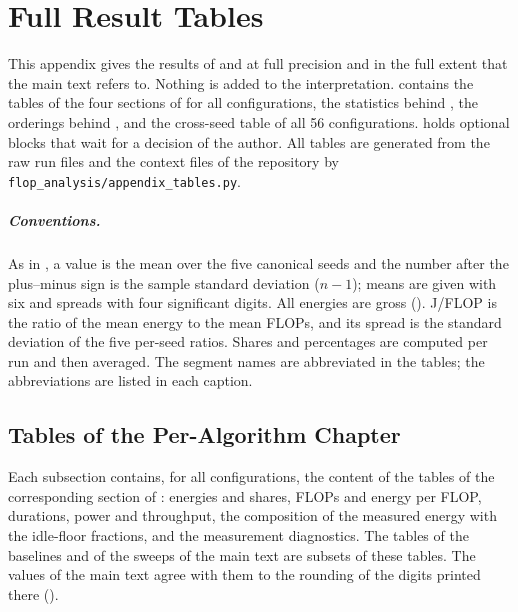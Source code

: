 \chapter{Full Result Tables}
\label{app:full-results}

This appendix gives the results of  and  at full precision and in the full extent that the main text refers to.
Nothing is added to the interpretation.
 contains the tables of the four sections of  for all configurations,  the statistics behind ,  the orderings behind , and  the cross-seed table of all \num{56} configurations.
 holds optional blocks that wait for a decision of the author.
All tables are generated from the raw run files and the context files of the repository by \texttt{flop\_\allowbreak analysis/\allowbreak appendix\_\allowbreak tables.py}.

\paragraph{Conventions.} As in , a value is the mean over the five canonical seeds and the number after the plus--minus sign is the sample standard deviation ($n-1$); means are given with six and spreads with four significant digits.
All energies are gross ().
J/FLOP is the ratio of the mean energy to the mean FLOPs, and its spread is the standard deviation of the five per-seed ratios.
Shares and percentages are computed per run and then averaged.
The segment names are abbreviated in the tables; the abbreviations are listed in each caption.

\section{Tables of the Per-Algorithm Chapter}\label{sec:app-full-ch4}

Each subsection contains, for all configurations, the content of the tables of the corresponding section of : energies and shares, FLOPs and energy per FLOP, durations, power and throughput, the composition of the measured energy with the idle-floor fractions, and the measurement diagnostics.
The tables of the baselines and of the sweeps of the main text are subsets of these tables.
The values of the main text agree with them to the rounding of the digits printed there ().

